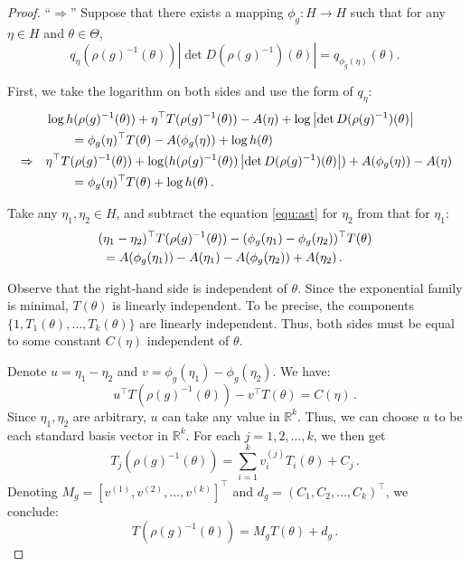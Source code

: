 \documentclass{article}
\begin{document}
\begin{proof}
    ``$\Rightarrow$'' Suppose that there exists a mapping $\phi_{g}: H \to H$ such that for any $\eta \in H$ and $\theta \in \Theta$,
    \begin{equation}
        q_{\eta}(\rho(g)^{-1}(\theta)) \left|\det D(\rho(g)^{-1})(\theta)\right| = q_{\phi_{g}(\eta)}(\theta).
    \end{equation}
    
    First, we take the logarithm on both sides and use the form of $q_\eta$:
    \begin{align}
        &&&\log h(\rho(g)^{-1}(\theta)) + \eta^\top T(\rho(g)^{-1}(\theta)) - A(\eta) + \log \left|\det D(\rho(g)^{-1})(\theta)\right| \notag \\
        &&& \qquad =\phi_{g}(\eta)^\top T(\theta) - A(\phi_{g}(\eta)) + \log h(\theta) \\
        &\Rightarrow&& \eta^\top T(\rho(g)^{-1}(\theta)) + \log (h(\rho(g)^{-1}(\theta)) \left|\det D(\rho(g)^{-1})(\theta)\right|) + A(\phi_{g}(\eta)) - A(\eta) \notag \\
        &&& \qquad =\phi_{g}(\eta)^\top T(\theta) + \log h(\theta)\,. \label{equ:ast}
    \end{align}
    
    Take any $\eta_{1}, \eta_{2} \in H$, and subtract the equation \eqref{equ:ast} for $\eta_{2}$ from that for $\eta_{1}$:
    \begin{align}
        &(\eta_{1} - \eta_{2})^\top T(\rho(g)^{-1}(\theta)) - (\phi_{g}(\eta_{1}) - \phi_{g}(\eta_{2}))^\top T(\theta) \notag \\
        & \ =  A(\phi_{g}(\eta_{1})) - A(\eta_{1}) - A(\phi_{g}(\eta_{2})) + A(\eta_{2})\,.
    \end{align}

    Observe that the right-hand side is independent of $\theta$. Since the exponential family is minimal, $T(\theta)$ is linearly independent. To be precise, the components $\{1, T_{1}(\theta), \ldots, T_{k}(\theta)\}$ are linearly independent. Thus, both sides must be equal to some constant $C(\eta)$ independent of $\theta$. 

    Denote $u = \eta_{1} - \eta_{2}$ and $v = \phi_{g}(\eta_{1}) - \phi_{g}(\eta_{2})$. We have:
    \begin{equation}
        u^\top T(\rho(g)^{-1}(\theta)) - v^\top T(\theta) = C(\eta)\,.
    \end{equation}
    Since $\eta_{1}, \eta_{2}$ are arbitrary, $u$ can take any value in $\mathbb{R}^{k}$. Thus, we can choose $u$ to be each standard basis vector in $\mathbb{R}^{k}$. For each $j = 1, 2, \ldots, k$, we then get
    \begin{equation}
        T_{j}(\rho(g)^{-1}(\theta)) = \sum_{i=1}^{k} v_{i}^{(j)} T_{i}(\theta) + C_{j}\,.
    \end{equation}
    Denoting $M_{g} = [v^{(1)}, v^{(2)}, \ldots, v^{(k)}]^\top$ and $d_{g} = (C_{1}, C_{2}, \ldots, C_{k})^\top$, we conclude:
    \begin{equation}
        T(\rho(g)^{-1}(\theta)) = M_{g} T(\theta) + d_{g}\,.
    \end{equation}


\end{proof}
\end{document}
